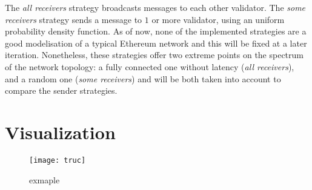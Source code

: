 The \textit{all receivers} strategy broadcasts messages to each other validator.
The \textit{some receivers} strategy sends a message to \(1\) or more validator,
using an uniform probability density function.  As of now, none of the
implemented strategies are a good modelisation of a typical Ethereum network and
this will be fixed at a later iteration.  Nonetheless, these strategies offer
two extreme points on the spectrum of the network topology: a fully connected
one without latency (\textit{all receivers}), and a random one (\textit{some
receivers}) and will be both taken into account to compare the sender
strategies.


\section{Visualization}
\begin{figure}
	\centering
	\texttt{[image: truc]}
  \captionsetup{justification=centering}
  \caption{exmaple}
	\label{fig:asdasdasdasd}
\end{figure}

